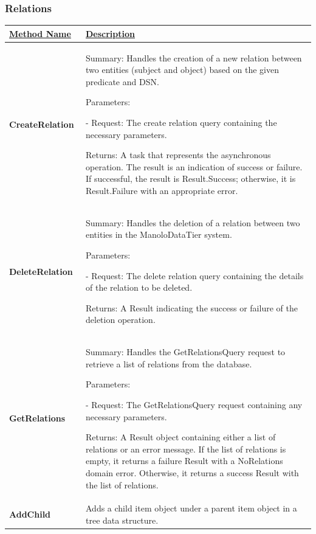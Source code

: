 \newpage
\subsubsection{Relations}
\begin{longtable}
    \centering
    \renewcommand{\arraystretch}{1.2}
    \begin{tabular}{|p{0.25\linewidth}|p{0.75\linewidth}|}
\hline
    \underline{Method Name} & \underline{Description} 
\\
\hline
    \textbf{CreateRelation} & Summary: Handles the creation of a new relation between two entities (subject and object) based on the given predicate and 	DSN.
    
Parameters:

- Request: The create relation query containing the necessary parameters.

Returns: A task that represents the asynchronous operation. 	The result is an indication of success or failure. If successful, the result is Result.Success; otherwise, it is Result.Failure with an appropriate error.
\\
\hline
    \textbf{DeleteRelation} & Summary: Handles the deletion of a relation between two entities in the ManoloDataTier system.
    
Parameters:

- Request: The delete relation query containing the details of the relation to be deleted.

Returns: A Result indicating the success or failure of the deletion operation.
\\
\hline
    \textbf{GetRelations} & Summary: Handles the GetRelationsQuery request to retrieve a list of relations from the database.
    
Parameters:

- Request: The GetRelationsQuery request containing any necessary parameters.

Returns: A Result object containing either a list of relations or an error message. If the list of relations is empty, it returns a failure Result with a NoRelations domain error. Otherwise, it returns a success Result with the list of relations.
\\
\hline
    \textbf{AddChild} & Adds a child item object under a parent item object in a tree data structure.
    

\end{tabular}
\end{longtable}
